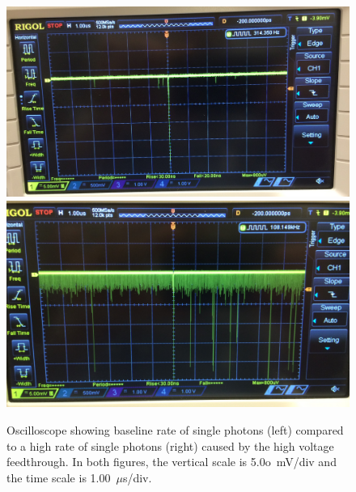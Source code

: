 \begin{figure}[htbp]
\begin{center}
\includegraphics[width=\halffig]{figures/testbed/baseline.jpg}
\includegraphics[width=\halffig]{figures/testbed/phog.jpg}
\caption{Oscilloscope showing baseline rate of single photons (left) compared to a high rate of single photons (right) caused by the high voltage feedthrough. In both figures, the vertical scale is 5.0o~mV/div and the time scale is 1.00~$\mu$s/div.}
\label{fig:phog}
\end{center}
\end{figure}


